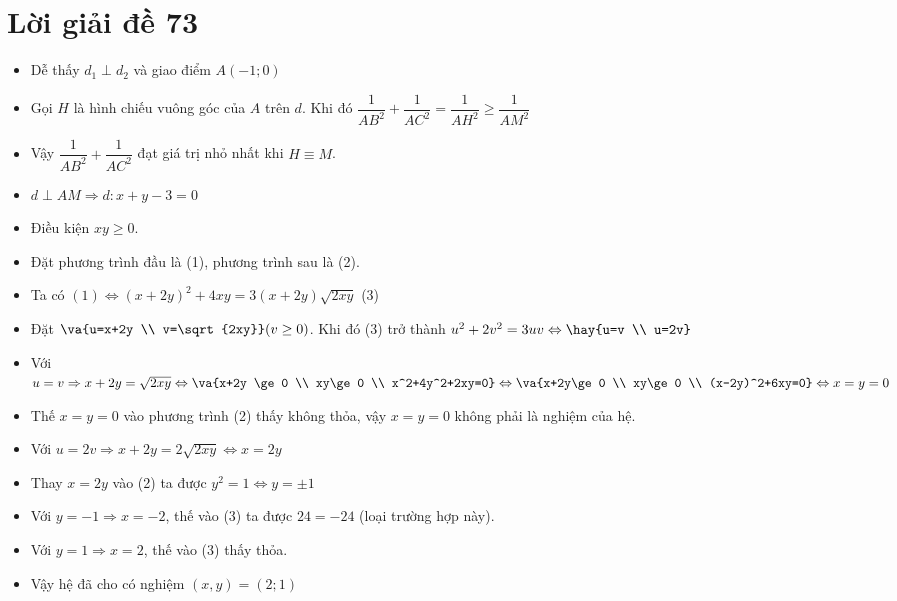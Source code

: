 \section{Lời giải đề 73}
\lgi 
\begin{itemize}[leftmargin=*,label=]
\item Dễ thấy $d_1\perp d_2$ và giao điểm $A(-1;0)$
\item Gọi $H$ là hình chiếu vuông góc của $A$ trên $d$. Khi đó $\dfrac{1}{AB^2}+\dfrac{1}{AC^2}=\dfrac{1}{AH^2}\ge \dfrac{1}{AM^2}$
\item Vậy $\dfrac{1}{AB^2}+\dfrac{1}{AC^2}$ đạt giá trị nhỏ nhất khi $H\equiv M$.
\item $d\perp AM\Rightarrow d:x+y-3=0$
\end{itemize}

\lgi 
\begin{itemize}[label=,leftmargin=*]
\item Điều kiện $xy \ge 0$.
\item Đặt phương trình đầu là (1), phương trình sau là (2).
\item Ta có $(1) \Leftrightarrow (x+2y)^2+4xy=3(x+2y)\sqrt{2xy}$ (3)
\item Đặt $\va{u=x+2y \\ v=\sqrt{2xy}} (v\ge 0)$. Khi đó (3) trở thành $u^2+2v^2=3uv \Leftrightarrow \hay{u=v \\ u=2v} $
\item Với $u=v \Rightarrow x+2y=\sqrt{2xy}\Leftrightarrow \va{x+2y \ge 0 \\ xy\ge 0 \\ x^2+4y^2+2xy=0} \Leftrightarrow \va{x+2y\ge 0 \\ xy\ge 0 \\  (x-2y)^2+6xy=0}\Leftrightarrow x=y=0 $
\item Thế $x=y=0$ vào phương trình (2) thấy không thỏa, vậy $x=y=0$ không phải là nghiệm của hệ.
\item Với $u=2v\Rightarrow x+2y=2\sqrt{2xy} \Leftrightarrow x=2y$
\item Thay $x=2y$ vào (2) ta được $y^2=1 \Leftrightarrow y=\pm 1$
\item Với $y=-1\Rightarrow x=-2$, thế vào (3) ta được $24=-24$ (loại trường hợp này).
\item Với $y=1 \Rightarrow x=2$, thế vào (3) thấy thỏa.
\item Vậy hệ đã cho có nghiệm $(x,y)=(2;1)$
\end{itemize}

